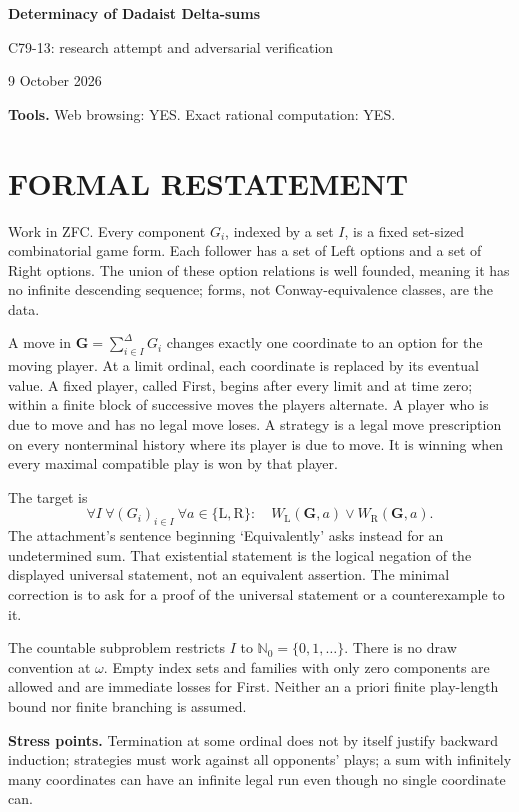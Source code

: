 \documentclass[11pt,a4paper]{article}
\theoremstyle{definition}\newtheorem{definition}[theorem]{Definition}
\theoremstyle{remark}\newtheorem{remark}[theorem]{Remark}
\newcommand{\N}{\mathbb N}\newcommand{\E}{\mathbb E}
\newcommand{\1}{\mathbf 1}
\begin{document}
\begin{center}
{\Large\bfseries Determinacy of Dadaist Delta-sums}\par
\medskip
{\large C79-13: research attempt and adversarial verification}\par
9 October 2026
\end{center}
\textbf{Tools.} Web browsing: YES. Exact rational computation: YES.\par
\section{FORMAL RESTATEMENT}
Work in ZFC. Every component $G_i$, indexed by a set $I$, is a fixed set-sized combinatorial game form. Each follower has a set of Left options and a set of Right options. The union of these option relations is well founded, meaning it has no infinite descending sequence; forms, not Conway-equivalence classes, are the data.

A move in $\mathbf G=\sum_{i\in I}^{\Delta}G_i$ changes exactly one coordinate to an option for the moving player. At a limit ordinal, each coordinate is replaced by its eventual value. A fixed player, called First, begins after every limit and at time zero; within a finite block of successive moves the players alternate. A player who is due to move and has no legal move loses. A strategy is a legal move prescription on every nonterminal history where its player is due to move. It is winning when every maximal compatible play is won by that player.

The target is
\[
 \forall I\ \forall(G_i)_{i\in I}\ \forall a\in\{\mathrm L,\mathrm R\}:\quad
 W_{\mathrm L}(\mathbf G,a)\lor W_{\mathrm R}(\mathbf G,a).
\]
The attachment's sentence beginning `Equivalently' asks instead for an undetermined sum. That existential statement is the logical negation of the displayed universal statement, not an equivalent assertion. The minimal correction is to ask for a proof of the universal statement or a counterexample to it.

The countable subproblem restricts $I$ to $\N_0=\{0,1,\ldots\}$. There is no draw convention at $\omega$. Empty index sets and families with only zero components are allowed and are immediate losses for First. Neither an a priori finite play-length bound nor finite branching is assumed.

\textbf{Stress points.} Termination at some ordinal does not by itself justify backward induction; strategies must work against all opponents' plays; a sum with infinitely many coordinates can have an infinite legal run even though no single coordinate can.
\end{document}
